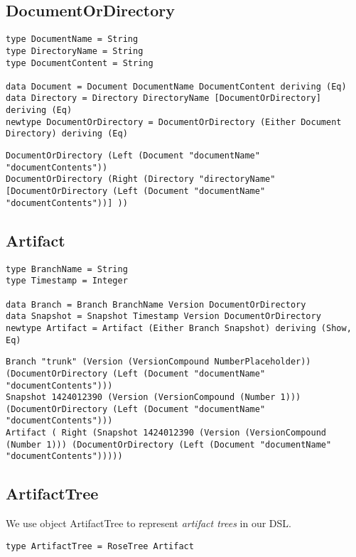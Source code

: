 \documentclass[11pt]{article}
\begin{document}
\subsection{DocumentOrDirectory}
\begin{lstlisting}[style=Haskell]
type DocumentName = String
type DirectoryName = String
type DocumentContent = String

data Document = Document DocumentName DocumentContent deriving (Eq)
data Directory = Directory DirectoryName [DocumentOrDirectory] deriving (Eq)
newtype DocumentOrDirectory = DocumentOrDirectory (Either Document Directory) deriving (Eq)
\end{lstlisting}

\begin{lstlisting}[style=Examples]
DocumentOrDirectory (Left (Document "documentName" "documentContents"))
DocumentOrDirectory (Right (Directory "directoryName" [DocumentOrDirectory (Left (Document "documentName" "documentContents"))] ))
\end{lstlisting}

\subsection{Artifact}
\begin{lstlisting}[style=Haskell]
type BranchName = String
type Timestamp = Integer

data Branch = Branch BranchName Version DocumentOrDirectory
data Snapshot = Snapshot Timestamp Version DocumentOrDirectory 
newtype Artifact = Artifact (Either Branch Snapshot) deriving (Show, Eq)
\end{lstlisting}

\begin{lstlisting}[style=Examples]
Branch "trunk" (Version (VersionCompound NumberPlaceholder)) (DocumentOrDirectory (Left (Document "documentName" "documentContents")))
Snapshot 1424012390 (Version (VersionCompound (Number 1))) (DocumentOrDirectory (Left (Document "documentName" "documentContents")))
Artifact ( Right (Snapshot 1424012390 (Version (VersionCompound (Number 1))) (DocumentOrDirectory (Left (Document "documentName" "documentContents")))))
\end{lstlisting}

\subsection{ArtifactTree}
We use object ArtifactTree to represent \textit{artifact trees} in our DSL.
\begin{lstlisting}[style=Haskell]
type ArtifactTree = RoseTree Artifact
\end{lstlisting}
\end{document}
